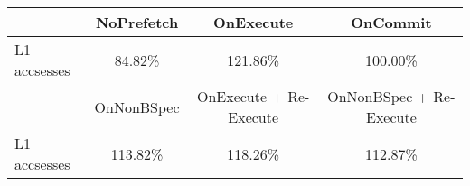 \begin{tabular}{ l|ccc }
 & NoPrefetch & OnExecute & OnCommit\\ \hline
L1 accsesses & 84.82\% & 121.86\% & 100.00\%\\ \hline
\hline
 & OnNonBSpec & OnExecute + Re-Execute & OnNonBSpec + Re-Execute\\ \hline
L1 accsesses & 113.82\% & 118.26\% & 112.87\%\\ \hline
\end{tabular}

